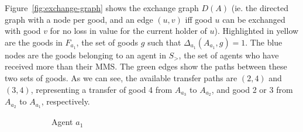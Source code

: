Figure~\ref{fig:exchange-graph} shows the exchange graph $D(A)$ (ie. the directed graph with a node per good, and an edge $(u,v)$ iff good $u$ can be exchanged with good $v$ for no loss in value for the current holder of $u$). Highlighted in yellow are the goods in $F_{a_1}$, the set of goods $g$ such that $\Delta_{a_1}(A_{a_1}, g) = 1$. The blue nodes are the goods belonging to an agent in $S_>$, the set of agents who have received more than their MMS. The green edges show the paths between these two sets of goods. As we can see, the available transfer paths are $(2,4)$ and $(3,4)$, representing a transfer of good 4 from $A_{a_3}$ to $A_{a_2}$, and good 2 or 3 from $A_{a_2}$ to $A_{a_1}$, respectively.


\begin{figure}[ht!]
    \begin{subfigure}{0.3\textwidth}
      \centering
      \caption{Agent $a_1$}
    \end{subfigure}
    \hfill
    \begin{subfigure}{0.3\textwidth}
      \centering
\end{subfigure}
\end{figure}
